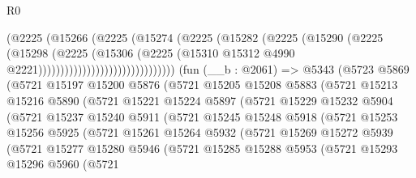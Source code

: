 \begin{lexlean}{R0}
\begin{coremodule}
                                      (@2225
                                        (@15266
                                          (@2225
                                            (@15274
                                              (@2225
                                                (@15282
                                                  (@2225
                                                    (@15290
                                                      (@2225
                                                        (@15298
                                                          (@2225
                                                            (@15306
                                                              (@2225
                                                                (@15310
                                                                  @15312
                                                                  @4990
                                                                  @2221)))))))))))))))))))))))))))))))
    (fun (__b : @2061) =>
    @5343
      (@5723
        @5869
        (@5721
          @15197
          @15200
          @5876
          (@5721
            @15205
            @15208
            @5883
            (@5721
              @15213
              @15216
              @5890
              (@5721
                @15221
                @15224
                @5897
                (@5721
                  @15229
                  @15232
                  @5904
                  (@5721
                    @15237
                    @15240
                    @5911
                    (@5721
                      @15245
                      @15248
                      @5918
                      (@5721
                        @15253
                        @15256
                        @5925
                        (@5721
                          @15261
                          @15264
                          @5932
                          (@5721
                            @15269
                            @15272
                            @5939
                            (@5721
                              @15277
                              @15280
                              @5946
                              (@5721
                                @15285
                                @15288
                                @5953
                                (@5721
                                  @15293
                                  @15296
                                  @5960
                                  (@5721

\end{coremodule}
\end{lexlean}
